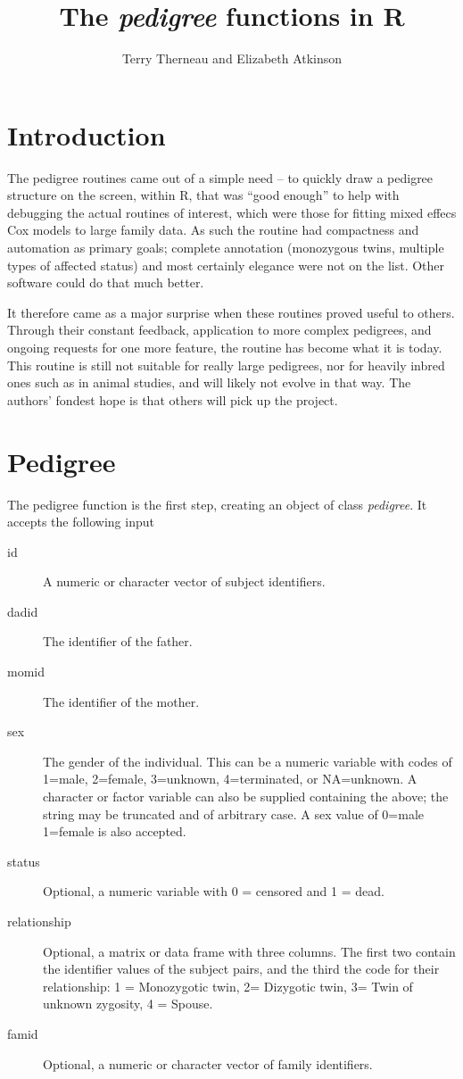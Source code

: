 \documentclass{article}
\title{The \emph{pedigree} functions in R}
\author{Terry Therneau and Elizabeth Atkinson}
\begin{document}
\maketitle
\tableofcontents
\section{Introduction}
The pedigree routines came out of a simple need -- to quickly draw a
pedigree structure on the screen, within R, that was ``good enough'' to
help with debugging the actual routines of interest, which were those for
fitting mixed effecs Cox models to large family data.  As such the routine
had compactness and automation as primary goals; complete annotation
(monozygous twins, multiple types of affected status) and most certainly
elegance were not on the list.  Other software could do that much
better.

It therefore came as a major surprise when these routines proved useful
to others.  Through their constant feedback, application to more
complex pedigrees, and ongoing requests for one more feature, the routine has 
become what it is today.  This routine is still not 
suitable for really large pedigrees, nor for heavily inbred ones such as in
animal studies, and will likely not evolve in that way.  The authors' fondest%
hope is that others will pick up the project.

\section{Pedigree}
The pedigree function is the first step, creating an object of class
\emph{pedigree}.  
It accepts the following input
\begin{description}
  \item[id] A numeric or character vector of subject identifiers.
  \item[dadid] The identifier of the father.
  \item[momid] The identifier of the mother.
  \item[sex] The gender of the individual.  This can be a numeric variable
    with codes of 1=male, 2=female, 3=unknown, 4=terminated, or NA=unknown.
    A character or factor variable can also be supplied containing
    the above; the string may be truncated and of arbitrary case.  A sex
    value of 0=male 1=female is also accepted.
  \item[status] Optional, a numeric variable with 0 = censored and 1 = dead.
  \item[relationship] Optional, a matrix or data frame with three columns.
    The first two contain the identifier values of the subject pairs, and
    the third the code for their relationship:
    1 = Monozygotic twin, 2= Dizygotic twin, 3= Twin of unknown zygosity,
    4 = Spouse.  
  \item[famid] Optional, a numeric or character vector of family identifiers.
\end{description}
\end{document}
